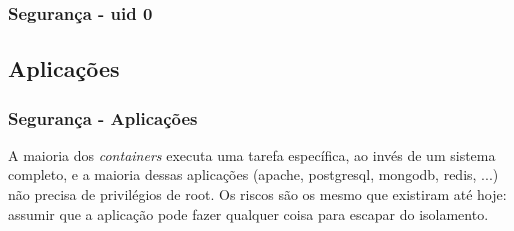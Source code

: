 \documentclass{beamer}
\begin{document}
\begin{frame}
    \frametitle{Segurança - uid 0}
\end{frame}

\subsection{Aplicações}

\begin{frame}
    \frametitle{Segurança - Aplicações}
    A maioria dos \textit{containers} executa uma tarefa específica, ao invés
    de um sistema completo, e a maioria dessas aplicações (apache, postgresql,
    mongodb, redis, ...) não precisa de privilégios de root. Os riscos são os
    mesmo que existiram até hoje: assumir que a aplicação pode fazer qualquer
    coisa para escapar do isolamento.
\end{frame}
\end{document}

